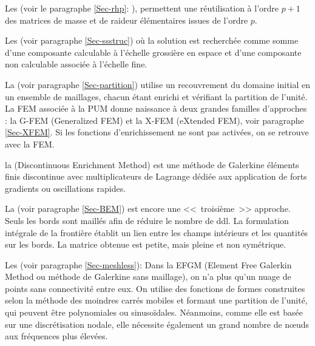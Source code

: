 \medskip
Les 
(voir le paragraphe \ref{Sec-rhp}:
), permettent une réutilisation à l'ordre $p+1$ des matrices
de masse et de raideur élémentaires issues de l'ordre $p$.

Les  (voir paragraphe \ref{Sec-ssstruc}) où la solution est
recherchée comme somme d'une composante calculable à l'échelle grossière en espace et
d'une composante non calculable associée à l'échelle fine.

La  (voir paragraphe \ref{Sec-partition}) utilise un recouvrement
du domaine initial en un ensemble  de maillages, chacun étant enrichi et vérifiant la partition de l'unité.
La FEM associée à la PUM donne naissance à deux grandes familles d'approches :
la G-FEM (Generalized FEM) et la X-FEM (eXtended FEM),
voir paragraphe \ref{Sec-XFEM}.
Si les fonctions d'enrichissement ne sont pas activées, on se retrouve avec la FEM.

la 
(Discontinuous Enrichment Method) est une méthode de Galerkine éléments finis
discontinue avec multiplicateurs de Lagrange
dédiée aux application de forts gradients ou oscillations rapides.

\bigskip
La 
(voir paragraphe \ref{Sec-BEM}) est encore une <<~troisième~>> approche.
Seuls les bords sont maillés afin de réduire le nombre de ddl.
La formulation intégrale de la frontière établit un lien entre les champs intérieurs
et les quantités sur les bords.
La matrice obtenue est petite, mais pleine et non symétrique.

\bigskip
Les  (voir paragraphe \ref{Sec-meshless}):
Dans la EFGM (Element Free Galerkin Method ou méthode de Galerkine sans maillage),
on n'a plus qu'un nuage de points sans connectivité entre eux.
On utilise des fonctions de formes construites selon la méthode des moindres carrés mobiles et
formant une partition de l'unité, qui peuvent être polynomiales
ou sinusoïdales.
Néanmoins, comme elle est basée sur une discrétisation nodale, elle nécessite également
un grand nombre de nœuds aux fréquences plus élevées.

